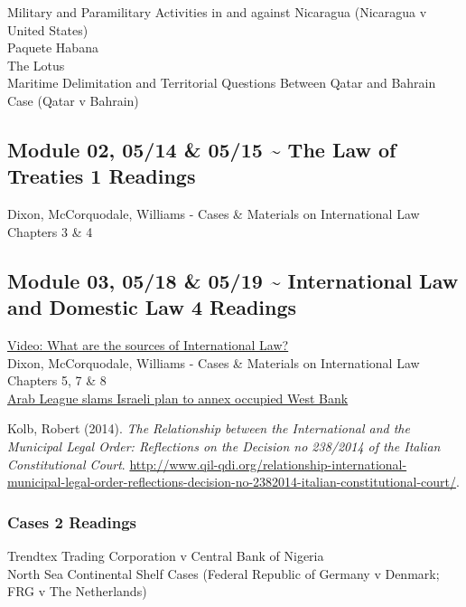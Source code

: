 \documentclass[10pt,]{article}
\begin{document}
Military and Paramilitary Activities in and against Nicaragua (Nicaragua
v United States)\\
Paquete Habana\\
The Lotus\\
Maritime Delimitation and Territorial Questions Between Qatar and
Bahrain Case (Qatar v Bahrain)

\hypertarget{module-02-0514-0515-the-law-of-treaties-1-readings}{%
\subsection{Module 02, 05/14 \& 05/15 \textasciitilde{} The Law of
Treaties \textbar{} 1
Readings}\label{module-02-0514-0515-the-law-of-treaties-1-readings}}

Dixon, McCorquodale, Williams - Cases \& Materials on International Law
Chapters 3 \& 4

\hypertarget{module-03-0518-0519-international-law-and-domestic-law-4-readings}{%
\subsection{Module 03, 05/18 \& 05/19 \textasciitilde{} International
Law and Domestic Law \textbar{} 4
Readings}\label{module-03-0518-0519-international-law-and-domestic-law-4-readings}}

\href{https://www.youtube.com/watch?v=0ViSYjt-wGw}{Video: What are the
sources of International Law?}\\
Dixon, McCorquodale, Williams - Cases \& Materials on International Law
Chapters 5, 7 \& 8\\
\href{https://www.aljazeera.com/news/2020/04/arab-league-slams-israeli-plan-annex-occupied-west-bank-200430145602846.html}{Arab
League slams Israeli plan to annex occupied West Bank}

Kolb, Robert (2014).
\emph{The Relationship between the International and the Municipal Legal Order: Reflections on the Decision no 238/2014 of the Italian Constitutional Court}.
\url{http://www.qil-qdi.org/relationship-international-municipal-legal-order-reflections-decision-no-2382014-italian-constitutional-court/}.

\hypertarget{cases-2-readings}{%
\subsubsection{Cases \textbar{} 2 Readings}\label{cases-2-readings}}

Trendtex Trading Corporation v Central Bank of Nigeria\\
North Sea Continental Shelf Cases (Federal Republic of Germany v
Denmark; FRG v The Netherlands)
\end{document}

